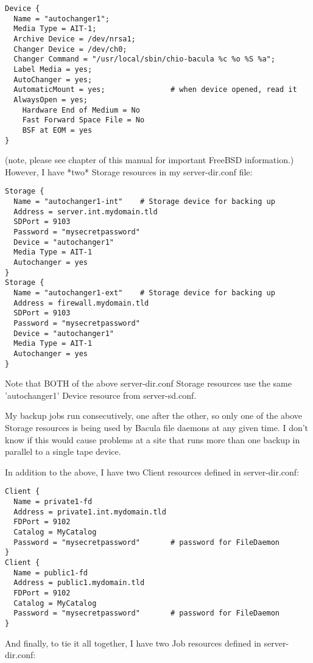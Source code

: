 \footnotesize
\begin{verbatim}
Device {
  Name = "autochanger1";
  Media Type = AIT-1;
  Archive Device = /dev/nrsa1;
  Changer Device = /dev/ch0;
  Changer Command = "/usr/local/sbin/chio-bacula %c %o %S %a";
  Label Media = yes;
  AutoChanger = yes;
  AutomaticMount = yes;               # when device opened, read it
  AlwaysOpen = yes;
    Hardware End of Medium = No
    Fast Forward Space File = No
    BSF at EOM = yes
}
\end{verbatim}
\normalsize

(note, please see 
 chapter of this manual
for important FreeBSD information.) However, I have *two* Storage resources in
my server-dir.conf file: 

\footnotesize
\begin{verbatim}
Storage {
  Name = "autochanger1-int"    # Storage device for backing up
  Address = server.int.mydomain.tld
  SDPort = 9103
  Password = "mysecretpassword"
  Device = "autochanger1"
  Media Type = AIT-1
  Autochanger = yes
}
Storage {
  Name = "autochanger1-ext"    # Storage device for backing up
  Address = firewall.mydomain.tld
  SDPort = 9103
  Password = "mysecretpassword"
  Device = "autochanger1"
  Media Type = AIT-1
  Autochanger = yes
}
\end{verbatim}
\normalsize

Note that BOTH of the above server-dir.conf Storage resources use the same
'autochanger1' Device resource from server-sd.conf. 

My backup jobs run consecutively, one after the other, so only one of the
above Storage resources is being used by Bacula file daemons at any given
time. I don't know if this would cause problems at a site that runs more than
one backup in parallel to a single tape device. 

In addition to the above, I have two Client resources defined in
server-dir.conf: 

\footnotesize
\begin{verbatim}
Client {
  Name = private1-fd
  Address = private1.int.mydomain.tld
  FDPort = 9102
  Catalog = MyCatalog
  Password = "mysecretpassword"       # password for FileDaemon
}
Client {
  Name = public1-fd
  Address = public1.mydomain.tld
  FDPort = 9102
  Catalog = MyCatalog
  Password = "mysecretpassword"       # password for FileDaemon
}
\end{verbatim}
\normalsize

And finally, to tie it all together, I have two Job resources defined in
server-dir.conf: 


